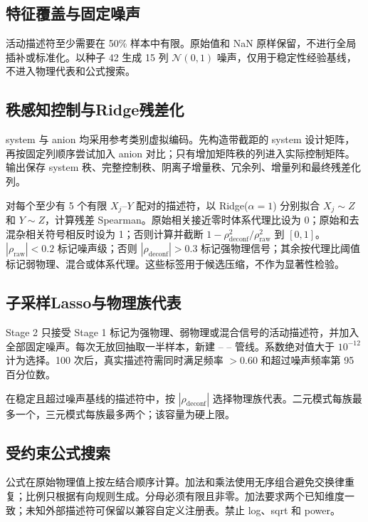 \subsection{特征覆盖与固定噪声}

活动描述符至少需要在 50\% 样本中有限。原始值和 NaN 原样保留，不进行全局插补或标准化。以种子 42 生成 15 列 $\mathcal N(0,1)$ 噪声，仅用于稳定性经验基线，不进入物理代表和公式搜索。

\subsection{秩感知控制与Ridge残差化}

system 与 anion 均采用参考类别虚拟编码。先构造带截距的 system 设计矩阵，再按固定列顺序尝试加入 anion 对比；只有增加矩阵秩的列进入实际控制矩阵。输出保存 system 秩、完整控制秩、阴离子增量秩、冗余列、增量列和最终残差化列。

对每个至少有 5 个有限 $X_j$--$Y$ 配对的描述符，以 Ridge($\alpha=1$) 分别拟合 $X_j\sim Z$ 和 $Y\sim Z$，计算残差 Spearman。原始相关接近零时体系代理比设为 0；原始和去混杂相关符号相反时设为 1；否则计算并截断 $1-\rho_{\mathrm{deconf}}^2/\rho_{\mathrm{raw}}^2$ 到 $[0,1]$。$|\rho_{\mathrm{raw}}|<0.2$ 标记噪声级；否则 $|\rho_{\mathrm{deconf}}|>0.3$ 标记强物理信号；其余按代理比阈值标记弱物理、混合或体系代理。这些标签用于候选压缩，不作为显著性检验。

\subsection{子采样Lasso与物理族代表}

Stage 2 只接受 Stage 1 标记为强物理、弱物理或混合信号的活动描述符，并加入全部固定噪声。每次无放回抽取一半样本，新建  --  --  管线。系数绝对值大于 $10^{-12}$ 计为选择。100 次后，真实描述符需同时满足频率 $>0.60$ 和超过噪声频率第 95 百分位数。

在稳定且超过噪声基线的描述符中，按 $|\rho_{\mathrm{deconf}}|$ 选择物理族代表。二元模式每族最多一个，三元模式每族最多两个；该容量为硬上限。

\subsection{受约束公式搜索}

公式在原始物理值上按左结合顺序计算。加法和乘法使用无序组合避免交换律重复；比例只根据有向规则生成。分母必须有限且非零。加法要求两个已知维度一致；未知外部描述符可保留以兼容自定义注册表。禁止 log、sqrt 和 power。

